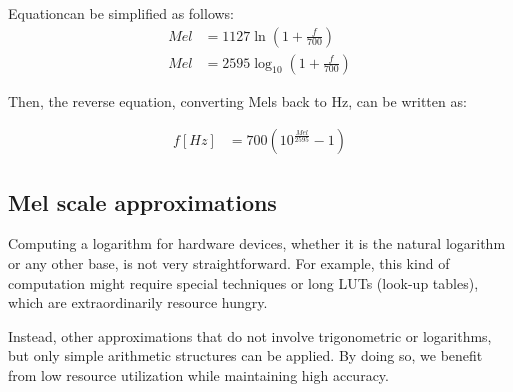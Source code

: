 Equation\;[\ref{eq:mel_1}] can be simplified as follows:
\begin{align}
    Mel & = 1127 \ln \left( 1 + \frac{f}{700} \right) \nonumber \\
    Mel & = 2595 \log_{10}\left( 1 + \frac{f}{700} \right)
\end{align}

Then, the reverse equation, converting Mels back to Hz,
can be written as:

\begin{align}
    f[Hz] & = 700 \left( 10^{\frac{Mel}{2595}} -1  \right)
\end{align}


\subsection{Mel scale approximations}
Computing a logarithm for hardware devices, 
whether it is the natural logarithm or any other base, 
is not very straightforward.
For example, this kind of computation might require special
techniques or long LUTs (look-up tables),
which are extraordinarily resource hungry.

Instead, other approximations that do not involve
trigonometric or logarithms, but only
simple arithmetic structures can be applied.
By doing so, we benefit from low resource
utilization while maintaining high accuracy.

